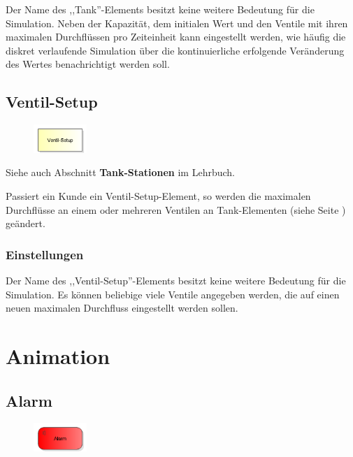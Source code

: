 Der Name des ,,Tank''-Elements besitzt keine weitere Bedeutung für die Simulation.
Neben der Kapazität, dem initialen Wert und den Ventile mit ihren maximalen Durchflüssen
pro Zeiteinheit kann eingestellt werden, wie häufig die diskret verlaufende Simulation über die kontinuierliche
erfolgende Veränderung des Wertes benachrichtigt werden soll.


\section{Ventil-Setup}
\label{ref:ModelElementTankValveSetup}

\begin{figure}
\vspace{-22pt}
\includegraphics[width=2cm]{imageModelElementTankValveSetup.png}
\vspace{-22pt}
\end{figure}

Siehe auch Abschnitt \textbf{Tank-Stationen} im Lehrbuch.

Passiert ein Kunde ein Ventil-Setup-Element, so werden die maximalen Durchflüsse an einem
oder mehreren Ventilen an Tank-Elementen (siehe Seite \pageref{ref:ModelElementTank}) geändert.

\subsection*{Einstellungen}

Der Name des ,,Ventil-Setup''-Elements besitzt keine weitere Bedeutung für die Simulation.
Es können beliebige viele Ventile angegeben werden, die auf einen neuen maximalen Durchfluss
eingestellt werden sollen.





\chapter{Animation}

\section{Alarm}
\label{ref:ModelElementAnimationAlarm}

\begin{figure}
\vspace{-22pt}
\includegraphics[width=2cm]{imageModelElementAnimationAlarm.png}
\vspace{-22pt}
\end{figure}

